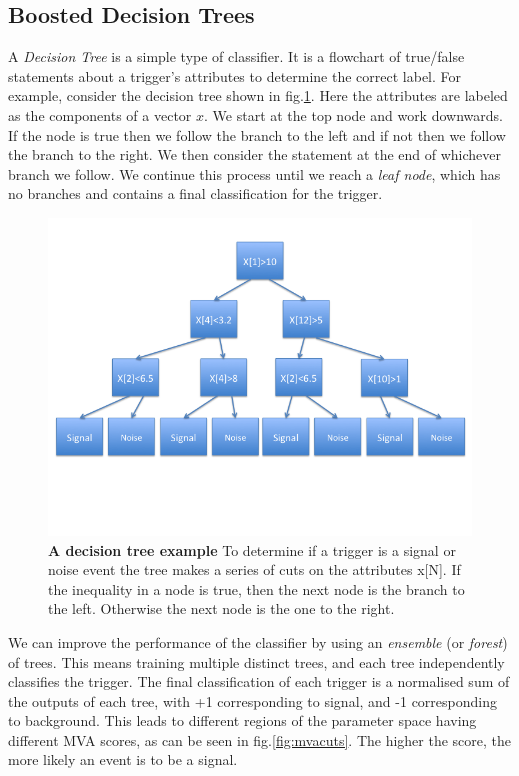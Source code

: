 \documentclass[12pt,twoside,a4paper]{report}
\begin{document}
\subsection{Boosted Decision Trees} \label{bdt}
A \textit{Decision Tree} is a simple type of classifier. It is a flowchart of true/false statements about a trigger's attributes to determine the correct label. For example, consider the decision tree shown in fig.\ref{fig:tree}. Here the attributes are labeled as the components of a vector $x$. We start at the top node and work downwards. If the node is true then we follow the branch to the left and if not then we follow the branch to the right. We then consider the statement at the end of whichever branch we follow. We continue this process until we reach a \textit{leaf node}, which has no branches and contains a final classification for the trigger.  
\begin{figure} %
\begin{center}
\includegraphics[width=0.8\linewidth]{Decision_tree.png}
\end{center}
\caption{\textbf{A decision tree example} To determine if a trigger is a signal or noise event the tree makes a series of cuts on the attributes x[N]. If the inequality in a node is true, then the next node is the branch to the left. Otherwise the next node is the one to the right. }
\label{fig:tree}
\end{figure}

We can improve the performance of the classifier by using an \textit{ensemble} (or \textit{forest}) of trees. This means training multiple distinct trees, and each tree independently classifies the trigger. The final classification of each trigger is a normalised sum of the outputs of each tree, with +1 corresponding to signal, and -1 corresponding to background. This leads to different regions of the parameter space having different MVA scores, as can be seen in fig.\ref{fig:mvacuts}. The higher the score, the more likely an event is to be a signal. 
\end{document}
